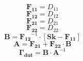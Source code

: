 \[ \mathbf{F_{11}} = D_{11} \]
\[ \mathbf{F_{12}} = D_{12} \]
\[ \mathbf{F_{21}} = D_{21} \]
\[ \mathbf{F_{22}} = D_{22} \]
\[ \mathbf{B}=\mathbf{F_{12}}^{-1}\cdot\left[ \mathbf{Sk} -
\mathbf{F_{11}} \right]  \]
\[ \mathbf{A}=\mathbf{F_{21}}+ \mathbf{F_{22}}\cdot\mathbf{B} \]
\[ \mathbf{\Gamma_{dut}} = \mathbf{B} \cdot \mathbf{A}^{-1} \]
